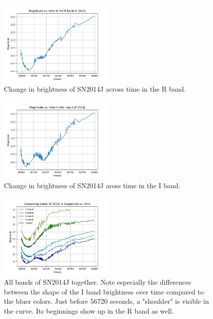 \begin{figure}[htp]
	\includegraphics[width=0.5\textwidth]{2014J_R_magvstime.png}
	\caption{Change in brightness of SN2014J across time in the R band.}
\end{figure}
\begin{figure}[htp]
	\includegraphics[width=0.5\textwidth]{2014J_I_magvstime.png}
	\caption{Change in brightness of SN2014J aross time in the I band.}
\end{figure}
\begin{figure}[htp]
	\includegraphics[width=0.5\textwidth]{2014J_all_magvstime.png}
	\caption{All bands of SN2014J together. Note especially the differences between the shape of the I band brightness over time compared to the bluer colors. Just before 56720 seconds, a "shoulder" is visible in the curve. Its beginnings show up in the R band as well.}
\end{figure}


